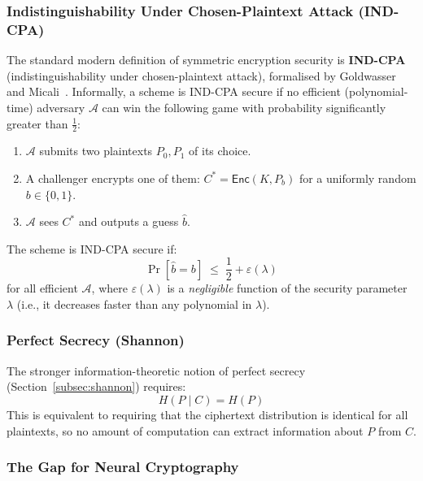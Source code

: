 \documentclass[12pt, a4paper]{article}
\begin{document}
\subsubsection*{Indistinguishability Under Chosen-Plaintext Attack (IND-CPA)}

The standard modern definition of symmetric encryption security is
\textbf{IND-CPA} (indistinguishability under chosen-plaintext attack),
formalised by Goldwasser and Micali~\cite{goldwasser1984probabilistic}.
Informally, a scheme is IND-CPA secure if no efficient (polynomial-time)
adversary $\mathcal{A}$ can win the following game with probability
significantly greater than $\tfrac{1}{2}$:

\begin{enumerate}[leftmargin=2em, itemsep=3pt]
  \item $\mathcal{A}$ submits two plaintexts $P_0, P_1$ of its choice.
  \item A challenger encrypts one of them: $C^* = \mathsf{Enc}(K, P_b)$
        for a uniformly random $b \in \{0,1\}$.
  \item $\mathcal{A}$ sees $C^*$ and outputs a guess $\hat{b}$.
\end{enumerate}

\noindent The scheme is IND-CPA secure if:
%
\begin{equation}
  \Pr[\hat{b} = b] \;\leq\; \frac{1}{2} + \varepsilon(\lambda)
  \label{eq:ind_cpa}
\end{equation}
%
for all efficient $\mathcal{A}$, where $\varepsilon(\lambda)$ is a
\emph{negligible} function of the security parameter $\lambda$ (i.e.,
it decreases faster than any polynomial in $\lambda$).

\subsubsection*{Perfect Secrecy (Shannon)}

The stronger information-theoretic notion of perfect secrecy
(Section~\ref{subsec:shannon}) requires:
%
\begin{equation}
  H(P \mid C) = H(P)
  \label{eq:perfect_secrecy_again}
\end{equation}
%
This is equivalent to requiring that the ciphertext distribution is
identical for all plaintexts, so no amount of computation can extract
information about $P$ from $C$.

\subsubsection*{The Gap for Neural Cryptography}
\end{document}
